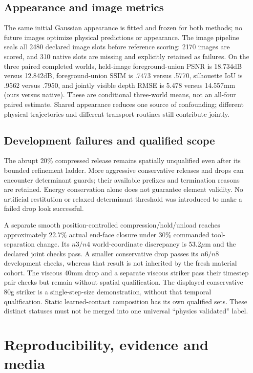\documentclass[10pt,twocolumn,letterpaper]{article}
\begin{document}
\subsection{Appearance and image metrics}
The same initial Gaussian appearance is fitted and frozen for both methods; no future images optimize physical predictions or appearance. The image pipeline seals all 2480 declared image slots before reference scoring: 2170 images are scored, and 310 native slots are missing and explicitly retained as failures. On the three paired completed worlds, held-image foreground-union PSNR is 18.734dB versus 12.842dB, foreground-union SSIM is .7473 versus .5770, silhouette IoU is .9562 versus .7950, and jointly visible depth RMSE is 5.478 versus 14.557mm (ours versus native). These are conditional three-world means, not an all-four paired estimate. Shared appearance reduces one source of confounding; different physical trajectories and different transport routines still contribute jointly.

\subsection{Development failures and qualified scope}
The abrupt 20\% compressed release remains spatially unqualified even after its bounded refinement ladder. More aggressive conservative releases and drops can encounter determinant guards; their available prefixes and termination reasons are retained. Energy conservation alone does not guarantee element validity. No artificial restitution or relaxed determinant threshold was introduced to make a failed drop look successful.

A separate smooth position-controlled compression/hold/unload reaches approximately 22.7\% actual end-face closure under 30\% commanded tool-separation change. Its $n3/n4$ world-coordinate discrepancy is 53.2$\mu$m and the declared joint checks pass. A smaller conservative drop passes its $n6/n8$ development checks, whereas that result is not inherited by the fresh material cohort. The viscous 40mm drop and a separate viscous striker pass their timestep pair checks but remain without spatial qualification. The displayed conservative 80g striker is a single-step-size demonstration, without that temporal qualification. Static learned-contact composition has its own qualified sets. These distinct statuses must not be merged into one universal ``physics validated'' label.

\section{Reproducibility, evidence and media}
\end{document}
